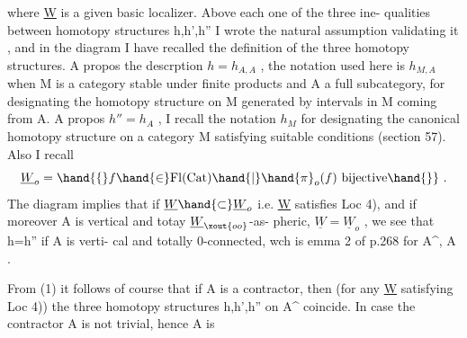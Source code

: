 where \uline{W} is a given basic localizer. Above each one of the three  ine-%
qualities between homotopy structures h,h',h'' I wrote the natural 
assumption  validating it , and  in the diagram I have
recalled the definition of the three homotopy structures. A propos
the descrption $h = h_{A\hat{},A}$ , the notation used here is $h_{M,A}$ when
M is a category stable under finite products and A a full subcategory,
for designating the homotopy structure on M generated by intervals in
M coming from A. A propos $h'' = h_{A\hat{}}$ , I recall the notation $h_M$ for
designating the canonical homotopy structure on a category M satisfying
suitable conditions (section 57). Also I recall
\[ \underline{W}_o = \hand{\{} f\hand{\in}\mathrm{Fl}(\mathrm{Cat}) \hand{|} \hand{\pi}_o(f) \text{ bijective}\hand{\}} \ . \]
The diagram implies that if $\underline{W}\hand{\subset}\underline{W}_o$ i.e. \uline{W} satisfies Loc 4), and if
moreover A is vertical and  totay $\underline{W}_{\xout{oo}}$-as-%
pheric,  
 $\underline{W} = \underline{W}_o$ , we see that h=h'' if A is verti-%
cal and totally 0-connected, wch is emma 2 of p.268 for A\^{}, A .

From (1) it follows of course that if A is a contractor, then
(for any \uline{W} satisfying Loc 4)) the three homotopy structures h,h',h''
on A\^{} coincide. In case the contractor A is not trivial, hence A is


